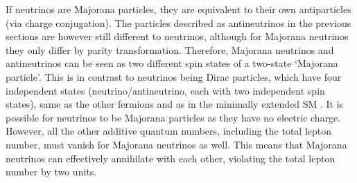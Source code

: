 If neutrinos are Majorana particles, they are equivalent to their own antiparticles (via charge conjugation). The particles described as antineutrinos in the previous sections are however still different to neutrinos, although for Majorana neutrinos they only differ by parity transformation. Therefore, Majorana neutrinos and antineutrinos can be seen as two different spin states of a two-state `Majorana particle'. This is in contrast to neutrinos being Dirac particles, which have four independent states (neutrino/antineutrino, each with two independent spin states), same as the other fermions and as in the minimally extended \gls{SM} \cite{FundamentalsOfNeutrinoPhysics.pdf}. It is possible for neutrinos to be Majorana particles as they have no electric charge. However, all the other additive quantum numbers, including the total lepton number, must vanish for Majorana neutrinos as well. This means that Majorana neutrinos can effectively annihilate with each other, violating the total lepton number by two units.



